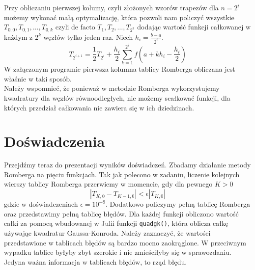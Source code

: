 \documentclass{article}
\begin{document}
Przy obliczaniu pierwszej kolumy, czyli złożonych wzorów trapezów dla $n = 2^i$ możemy wykonać małą optymalizację,
która pozwoli nam policzyć wszystkie $T_{0,0}, T_{0,1}, \ldots, T_{0,k}$ czyli de facto $T_1, T_{2}, \ldots, T_{2^k}$
dodając wartość funkcji całkowanej w każdym z $2^k$ węzłów tylko jeden raz. Niech $h_i = \frac{b-a}{2^i}$.
\begin{equation*}
	T_{2^{i+1}} = \frac{1}{2} T_{2^i} + \frac{h_i}{2} \sum_{k = 1}^{2^i} f\left(a + k h_i - \frac{h_i}{2}\right)
\end{equation*}
W załączonym programie pierwsza kolumna tablicy Romberga obliczana jest właśnie w taki sposób.\\
Należy wspomnieć, że ponieważ w metodzie Romberga wykorzystujemy kwadratury dla węzłów równoodległych, nie możemy
scałkować funkcji, dla których przedział całkowania nie zawiera się w ich dziedzinach.

\section{Doświadczenia}
Przejdźmy teraz do prezentacji wyników doświadczeń. Zbadamy działanie metody Romberga na pięciu funkcjach.
Tak jak polecono w zadaniu, liczenie kolejnych wierszy tablicy Romberga przerwiemy w momencie, gdy dla pewnego $K > 0$
\begin{equation*}
	|T_{K,0} - T_{K-1,0}| < \epsilon |T_{K,0}|
\end{equation*}
gdzie w doświadczeniach $\epsilon = 10^{-9}$.
\newline
\newline
Dodatkowo policzymy pełną tablicę Romberga oraz przedstawimy pełną tablicę błędów.
Dla każdej funkcji obliczono wartość całki za pomocą wbudowanej w Julii funkcji \verb+quadgk()+,
która oblicza całkę
używając kwadratur Gaussa-Konroda.
\newline
\newline
Należy zaznaczyć, że wartości przedstawione w tablicach błędów są bardzo mocno zaokrąglone. W przeciwnym wypadku
tablice byłyby zbyt szerokie i nie zmieściłyby się w sprawozdaniu. Jedyna ważna informacja w tablicach błędów, to
rząd błędu.
\end{document}
